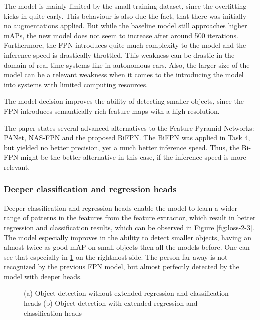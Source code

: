 \documentclass{article}
\begin{document}
The model is mainly limited by the small training dataset, since the overfitting kicks in quite early. This behaviour is also due the fact, that there was initially no augmentations applied. But while the baseline model still approaches higher mAPs, the new model does not seem to increase after around 500 iterations. Furthermore, the FPN introduces quite much complexity to the model and the inference speed is drastically throttled. This weakness can be drastic in the domain of real-time systems like in autonomous cars. Also, the larger size of the model can be a relevant weakness when it comes to the introducing the model into systems with limited computing resources.

The model decision improves the ability of detecting smaller objects, since the FPN introduces semantically rich feature maps with a high resolution.

The paper \cite{efficientdet} states several advanced alternatives to the Feature Pyramid Networks: PANet, NAS-FPN and the proposed BiFPN. The BiFPN was applied in Task 4, but yielded no better precision, yet a much better inference speed. Thus, the Bi-FPN might be the better alternative in this case, if the inference speed is more relevant.

\subsubsection*{Deeper classification and regression heads}

Deeper classification and regression heads enable the model to learn a wider range of patterns in the features from the feature extractor, which result in better regression and classification results, which can be observed in Figure \ref{fig:loss-2-3}. The model especially improves in the ability to detect smaller objects, having an almost twice as good mAP on small objects then all the models before. One can see that especially in \ref{fig:comparison2} on the rightmost side. The person far away is not recognized by the previous FPN model, but almost perfectly detected by the model with deeper heads.

\begin{figure}[t!]
    \centering
    \label{fig:comparison2}
    \caption{(a) Object detection without extended regression and classification heads (b) Object detection with extended regression and classification heads}
\end{figure}
\end{document}
